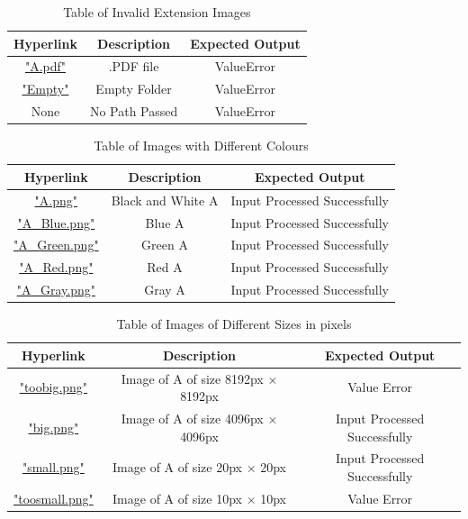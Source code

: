 \documentclass[12pt, titlepage]{article}
\begin{document}
\begin{table}[h!]
  \centering
  \begin{tabular}{|c|c|c|}
    \hline
    \textbf{Hyperlink} & \textbf{Description} & \textbf{Expected Output} \\ \hline
    \hyperref[A.pdf]{"A.pdf"} & .PDF file & ValueError \\ \hline
    \hyperref[Empty]{"Empty"} & Empty Folder & ValueError \\ \hline
    None & No Path Passed & ValueError \\ \hline
  \end{tabular}
  \caption{Table of Invalid Extension Images}
  \label{table_exterr}
\end{table}

\begin{table}[h!]
  \centering
  \begin{tabular}{|c|c|c|}
    \hline
    \textbf{Hyperlink} & \textbf{Description} & \textbf{Expected Output} \\ \hline
    \hyperref[A.png]{"A.png"} & Black and White A & Input Processed Successfully \\ \hline
    \hyperref[A_Blue.png]{"A_Blue.png"} & Blue A & Input Processed Successfully \\ \hline
    \hyperref[A_Green.png]{"A_Green.png"} & Green A & Input Processed Successfully \\ \hline
    \hyperref[A_Red.png]{"A_Red.png"} & Red A & Input Processed Successfully \\ \hline
    \hyperref[A_Gray.png]{"A_Gray.png"} & Gray A & Input Processed Successfully \\ \hline
  \end{tabular}
  \caption{Table of Images with Different Colours}
  \label{table_colour}
\end{table}

\begin{table}[h!]
  \centering
  \begin{tabular}{|c|c|c|}
    \hline
    \textbf{Hyperlink} & \textbf{Description} & \textbf{Expected Output} \\ \hline
    \hyperref[toobig.png]{"toobig.png"} & Image of A of size 8192px $\times$ 8192px & Value Error \\ \hline
    \hyperref[big.png]{"big.png"} & Image of A of size 4096px $\times$ 4096px & Input Processed Successfully \\ \hline
    \hyperref[small.png]{"small.png"} & Image of A of size 20px $\times$ 20px & Input Processed Successfully \\ \hline
    \hyperref[toosmall.png]{"toosmall.png"} & Image of A of size 10px $\times$ 10px & Value Error \\ \hline
  \end{tabular}
  \caption{Table of Images of Different Sizes in pixels}
  \label{table_size}
\end{table}
\end{document}
